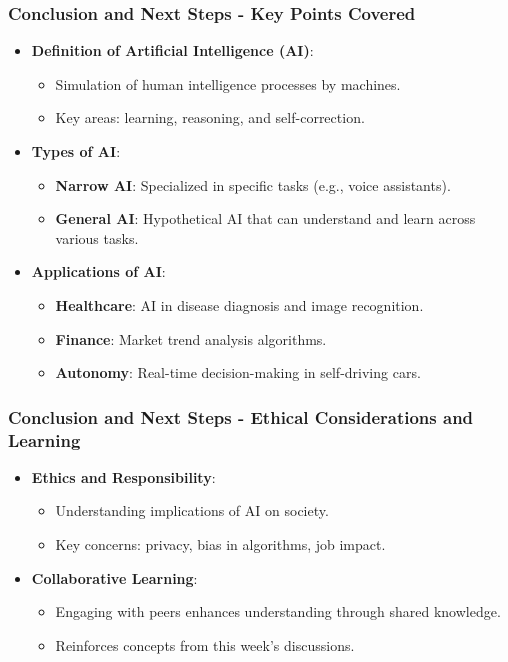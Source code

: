 \documentclass[aspectratio=169]{beamer}
\begin{document}
\begin{frame}[fragile]
    \frametitle{Conclusion and Next Steps - Key Points Covered}
    \begin{itemize}
        \item \textbf{Definition of Artificial Intelligence (AI)}:
        \begin{itemize}
            \item Simulation of human intelligence processes by machines.
            \item Key areas: learning, reasoning, and self-correction.
        \end{itemize}
        
        \item \textbf{Types of AI}:
        \begin{itemize}
            \item \textbf{Narrow AI}: Specialized in specific tasks (e.g., voice assistants).
            \item \textbf{General AI}: Hypothetical AI that can understand and learn across various tasks.
        \end{itemize}
        
        \item \textbf{Applications of AI}:
        \begin{itemize}
            \item \textbf{Healthcare}: AI in disease diagnosis and image recognition.
            \item \textbf{Finance}: Market trend analysis algorithms.
            \item \textbf{Autonomy}: Real-time decision-making in self-driving cars.
        \end{itemize}
    \end{itemize}
\end{frame}

\begin{frame}[fragile]
    \frametitle{Conclusion and Next Steps - Ethical Considerations and Learning}
    \begin{itemize}
        \item \textbf{Ethics and Responsibility}:
        \begin{itemize}
            \item Understanding implications of AI on society.
            \item Key concerns: privacy, bias in algorithms, job impact.
        \end{itemize}
        
        \item \textbf{Collaborative Learning}:
        \begin{itemize}
            \item Engaging with peers enhances understanding through shared knowledge.
            \item Reinforces concepts from this week’s discussions.
        \end{itemize}
    \end{itemize}
\end{frame}
\end{document}
